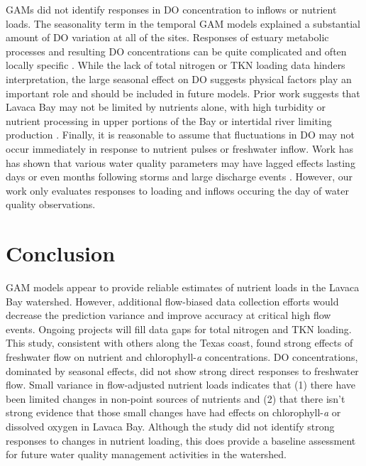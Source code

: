 \documentclass[sn-basic,referee,lineno,pdflatex]{sn-jnl}
\begin{document}
GAMs did not identify responses in DO concentration to inflows or
nutrient loads. The seasonality term in the temporal GAM models
explained a substantial amount of DO variation at all of the sites.
Responses of estuary metabolic processes and resulting DO concentrations
can be quite complicated and often locally specific
\citep{caffreyFactorsControllingNet2004}. While the lack of total
nitrogen or TKN loading data hinders interpretation, the large seasonal
effect on DO suggests physical factors play an important role and should
be included in future models. Prior work suggests that Lavaca Bay may
not be limited by nutrients alone, with high turbidity or nutrient
processing in upper portions of the Bay or intertidal river limiting
production \citep{russell_effect_2006}. Finally, it is reasonable to
assume that fluctuations in DO may not occur immediately in response to
nutrient pulses or freshwater inflow. Work has has shown that various
water quality parameters may have lagged effects lasting days or even
months following storms and large discharge events
\citep{mooneyWatershedExportEvents2012a, wetzExtremeFutureEstuaries2013, bukaveckasInfluenceStormEvents2020, walkerTimescalesMagnitudeWater2021}.
However, our work only evaluates responses to loading and inflows
occuring the day of water quality observations.

\hypertarget{conclusion}{%
\section{Conclusion}\label{conclusion}}

GAM models appear to provide reliable estimates of nutrient loads in the
Lavaca Bay watershed. However, additional flow-biased data collection
efforts would decrease the prediction variance and improve accuracy at
critical high flow events. Ongoing projects will fill data gaps for
total nitrogen and TKN loading. This study, consistent with others along
the Texas coast, found strong effects of freshwater flow on nutrient and
chlorophyll-\emph{a} concentrations. DO concentrations, dominated by
seasonal effects, did not show strong direct responses to freshwater
flow. Small variance in flow-adjusted nutrient loads indicates that (1)
there have been limited changes in non-point sources of nutrients and
(2) that there isn't strong evidence that those small changes have had
effects on chlorophyll-\emph{a} or dissolved oxygen in Lavaca Bay.
Although the study did not identify strong responses to changes in
nutrient loading, this does provide a baseline assessment for future
water quality management activities in the watershed.
\end{document}
